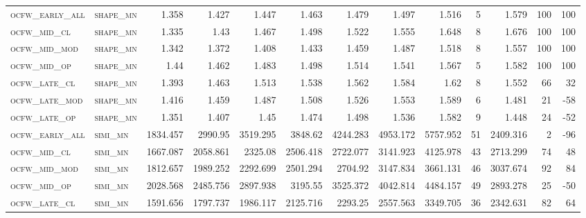 \begin{landscape}
\begin{center}
\begin{footnotesize}
\begin{longtable}{llrrrrrrrr|rrr}
\textsc{ocfw\_early\_all} & \textsc{shape\_mn }   & 1.358    & 1.427    & 1.447    & 1.463    & 1.479    & 1.497    & 1.516    & 5      & 1.579         & 100           & 100             \\
\textsc{ocfw\_mid\_cl   } & \textsc{shape\_mn }   & 1.335    & 1.43     & 1.467    & 1.498    & 1.522    & 1.555    & 1.648    & 8      & 1.676         & 100           & 100             \\
\textsc{ocfw\_mid\_mod  } & \textsc{shape\_mn }   & 1.342    & 1.372    & 1.408    & 1.433    & 1.459    & 1.487    & 1.518    & 8      & 1.557         & 100           & 100             \\
\textsc{ocfw\_mid\_op   } & \textsc{shape\_mn }   & 1.44     & 1.462    & 1.483    & 1.498    & 1.514    & 1.541    & 1.567    & 5      & 1.582         & 100           & 100             \\
\textsc{ocfw\_late\_cl  } & \textsc{shape\_mn }   & 1.393    & 1.463    & 1.513    & 1.538    & 1.562    & 1.584    & 1.62     & 8      & 1.552         & 66            & 32              \\
\textsc{ocfw\_late\_mod } & \textsc{shape\_mn }   & 1.416    & 1.459    & 1.487    & 1.508    & 1.526    & 1.553    & 1.589    & 6      & 1.481         & 21            & -58             \\
\textsc{ocfw\_late\_op  } & \textsc{shape\_mn }   & 1.351    & 1.407    & 1.45     & 1.474    & 1.498    & 1.536    & 1.582    & 9      & 1.448         & 24            & -52             \\
\textsc{ocfw\_early\_all} & \textsc{simi\_mn  }   & 1834.457 & 2990.95  & 3519.295 & 3848.62  & 4244.283 & 4953.172 & 5757.952 & 51     & 2409.316      & 2             & -96             \\
\textsc{ocfw\_mid\_cl   } & \textsc{simi\_mn  }   & 1667.087 & 2058.861 & 2325.08  & 2506.418 & 2722.077 & 3141.923 & 4125.978 & 43     & 2713.299      & 74            & 48              \\
\textsc{ocfw\_mid\_mod  } & \textsc{simi\_mn  }   & 1812.657 & 1989.252 & 2292.699 & 2501.294 & 2704.92  & 3147.834 & 3661.131 & 46     & 3037.674      & 92            & 84              \\
\textsc{ocfw\_mid\_op   } & \textsc{simi\_mn  }   & 2028.568 & 2485.756 & 2897.938 & 3195.55  & 3525.372 & 4042.814 & 4484.157 & 49     & 2893.278      & 25            & -50             \\
\textsc{ocfw\_late\_cl  } & \textsc{simi\_mn  }   & 1591.656 & 1797.737 & 1986.117 & 2125.716 & 2293.25  & 2557.563 & 3349.705 & 36     & 2342.631      & 82            & 64              \\

\end{longtable}
\end{footnotesize}
\end{center}
\end{landscape}
